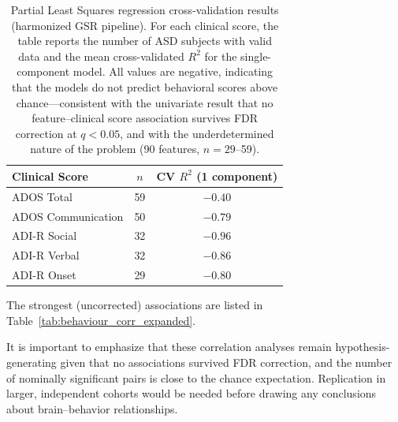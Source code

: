 \documentclass[10pt,letterpaper]{article}
\begin{document}
\begin{table}[H]
\centering
\small
\caption{Partial Least Squares regression cross-validation results (harmonized GSR pipeline). For
each clinical score, the table reports the number of ASD subjects with valid data and the mean
cross-validated $R^2$ for the single-component model. All values are negative, indicating that the
models do not predict behavioral scores above chance---consistent with the univariate result that no
feature--clinical score association survives FDR correction at $q < 0.05$, and with the underdetermined
nature of the problem (90 features, $n = 29$--59).}
\label{tab:pls_results}
\begin{tabular}{lcc}
\toprule
Clinical Score & $n$ & CV $R^2$ (1 component) \\
\midrule
ADOS Total          & 59 & $-0.40$ \\
ADOS Communication  & 50 & $-0.79$ \\
ADI-R Social        & 32 & $-0.96$ \\
ADI-R Verbal        & 32 & $-0.86$ \\
ADI-R Onset         & 29 & $-0.80$ \\
\bottomrule
\end{tabular}
\end{table}

The strongest (uncorrected) associations are listed in Table~\ref{tab:behaviour_corr_expanded}.

It is important to emphasize that these correlation analyses remain hypothesis-generating given that
no associations survived FDR correction, and the number of nominally significant pairs is close to
the chance expectation. Replication in larger, independent cohorts would be needed before drawing
any conclusions about brain--behavior relationships.
\end{document}
